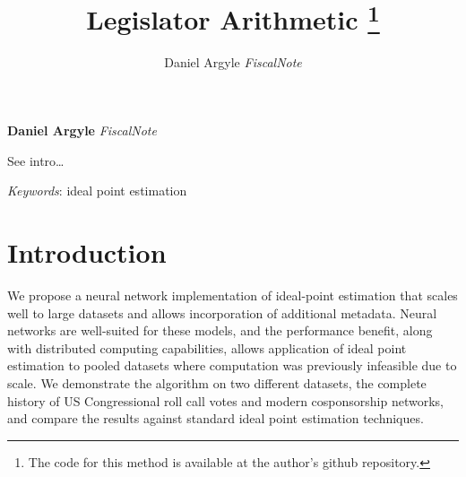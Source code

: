 \documentclass[11pt,]{article}
\title{Legislator Arithmetic \thanks{The code for this method is available at the author's github repository.}  }
\author{\Large Daniel Argyle\vspace{0.05in} \newline\normalsize\emph{FiscalNote}  }
\date{}
\newcommand*{\authorfont}{\fontfamily{phv}\selectfont}
\renewenvironment{abstract}
 {{%
    \setlength{\leftmargin}{0mm}
    \setlength{\rightmargin}{\leftmargin}%
  }%
  \relax}
 {\endlist}
\begin{document}
	
%

{%
\setlength{\parindent}{0pt}
\thispagestyle{plain}
{\fontsize{18}{20}\selectfont\raggedright 
\maketitle  %

}

{
   \vskip 13.5pt\relax \normalsize\fontsize{11}{12} 
\textbf{\authorfont Daniel Argyle} \hskip 15pt \emph{\small FiscalNote}   

}

}








\begin{abstract}

    \hbox{\vrule height .2pt width 39.14pc}

    \vskip 8.5pt %

\noindent See intro\ldots{}


\vskip 8.5pt \noindent \emph{Keywords}: ideal point estimation \par

    \hbox{\vrule height .2pt width 39.14pc}



\end{abstract}


\vskip 6.5pt


\noindent  \section{Introduction}\label{introduction}

We propose a neural network implementation of ideal-point estimation
that scales well to large datasets and allows incorporation of
additional metadata. Neural networks are well-suited for these models,
and the performance benefit, along with distributed computing
capabilities, allows application of ideal point estimation to pooled
datasets where computation was previously infeasible due to scale. We
demonstrate the algorithm on two different datasets, the complete
history of US Congressional roll call votes and modern cosponsorship
networks, and compare the results against standard ideal point
estimation techniques.
\end{document}
